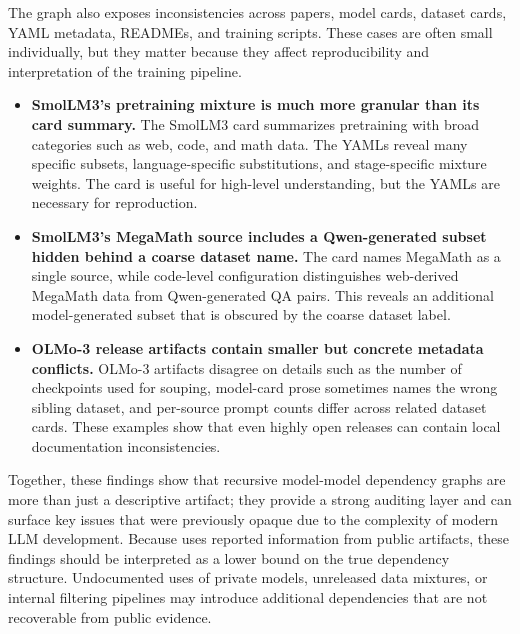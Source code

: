 The graph also exposes inconsistencies across papers, model cards, dataset cards, YAML metadata, READMEs, and training scripts. These cases are often small individually, but they matter because they affect reproducibility and interpretation of the training pipeline.

\begin{itemize}
    \item \textbf{SmolLM3's pretraining mixture is much more granular than its card summary.}
    The SmolLM3 card summarizes pretraining with broad categories such as web, code, and math data. The YAMLs reveal many specific subsets, language-specific substitutions, and stage-specific mixture weights. The card is useful for high-level understanding, but the YAMLs are necessary for reproduction.

    \item \textbf{SmolLM3's MegaMath source includes a Qwen-generated subset hidden behind a coarse dataset name.}
    The card names MegaMath as a single source, while code-level configuration distinguishes web-derived MegaMath data from Qwen-generated QA pairs. This reveals an additional model-generated subset that is obscured by the coarse dataset label.

    \item \textbf{OLMo-3 release artifacts contain smaller but concrete metadata conflicts.}
    OLMo-3 artifacts disagree on details such as the number of checkpoints used for souping, model-card prose sometimes names the wrong sibling dataset, and per-source prompt counts differ across related dataset cards. These examples show that even highly open releases can contain local documentation inconsistencies.
\end{itemize}

Together, these findings show that recursive model-model dependency graphs are more than just a descriptive artifact; they provide a strong auditing layer and can surface key issues that were previously opaque due to the complexity of modern LLM development. Because \system{} uses reported information from public artifacts, these findings should be interpreted as a lower bound on the true dependency structure. Undocumented uses of private models, unreleased data mixtures, or internal filtering pipelines may introduce additional dependencies that are not recoverable from public evidence.
